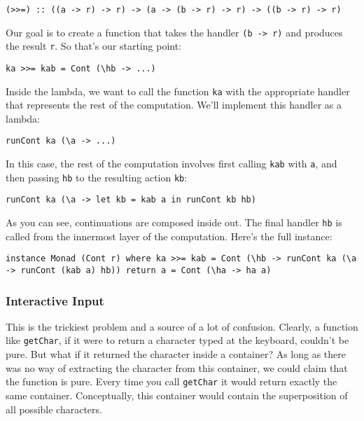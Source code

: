 \begin{verbatim}
(>>=) :: ((a -> r) -> r) -> (a -> (b -> r) -> r) -> ((b -> r) -> r)
\end{verbatim}

Our goal is to create a function that takes the handler
\texttt{(b\ -\textgreater{}\ r)} and produces the result \texttt{r}. So
that's our starting point:

\begin{verbatim}
ka >>= kab = Cont (\hb -> ...)
\end{verbatim}

Inside the lambda, we want to call the function \texttt{ka} with the
appropriate handler that represents the rest of the computation. We'll
implement this handler as a lambda:

\begin{verbatim}
runCont ka (\a -> ...)
\end{verbatim}

In this case, the rest of the computation involves first calling
\texttt{kab} with \texttt{a}, and then passing \texttt{hb} to the
resulting action \texttt{kb}:

\begin{verbatim}
runCont ka (\a -> let kb = kab a in runCont kb hb)
\end{verbatim}

As you can see, continuations are composed inside out. The final handler
\texttt{hb} is called from the innermost layer of the computation.
Here's the full instance:

\begin{verbatim}
instance Monad (Cont r) where ka >>= kab = Cont (\hb -> runCont ka (\a -> runCont (kab a) hb)) return a = Cont (\ha -> ha a)
\end{verbatim}

\subsubsection{Interactive Input}\label{interactive-input}

This is the trickiest problem and a source of a lot of confusion.
Clearly, a function like \texttt{getChar}, if it were to return a
character typed at the keyboard, couldn't be pure. But what if it
returned the character inside a container? As long as there was no way
of extracting the character from this container, we could claim that the
function is pure. Every time you call \texttt{getChar} it would return
exactly the same container. Conceptually, this container would contain
the superposition of all possible characters.

